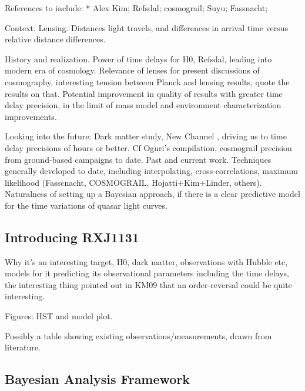 \documentclass{emulateapj}
\begin{document}

References to include: * Alex Kim; Refsdal; cosmograil; Suyu;
Fassnacht; 


Context. Lensing. Distances light travels, and differences in arrival
time versus relative distance differences.

History and realization. Power of time delays for H0, Refsdal, leading into modern
era of cosmology.  Relevance of lenses for present discussions of
cosmography, interesting tension between Planck and lensing results,
quote the results on that.  Potential improvement in quality of
results with greater time delay precision, in the limit of mass model
and environment characterization improvements. 

Looking into the future: Dark matter study, New Channel \citep{Keeton2009a}, driving us to
time delay precisions of hours or better.  Cf Oguri's compilation,
cosmograil precision from ground-based campaigns to date. Past and current work. 
Techniques generally developed to date, including interpolating, cross-correlations, maximum likelihood (Fasscnacht, COSMOGRAIL, Hojatti+Kim+Linder, others). Naturalness of setting up a Bayesian approach, if there is a clear predictive model for the time variations of quasar light curves. 

\subsection{Introducing RXJ1131}

Why it's an interesting target, H0, dark matter, observations with Hubble etc, models for it predicting its observational parameters including the time delays, the interesting thing pointed out in KM09 that an order-reversal could be quite interesting. 

Figures: HST and model plot. 

Possibly a table showing existing observations/measurements, drawn from literature. 

\subsection{Bayesian Analysis Framework}
\end{document}
